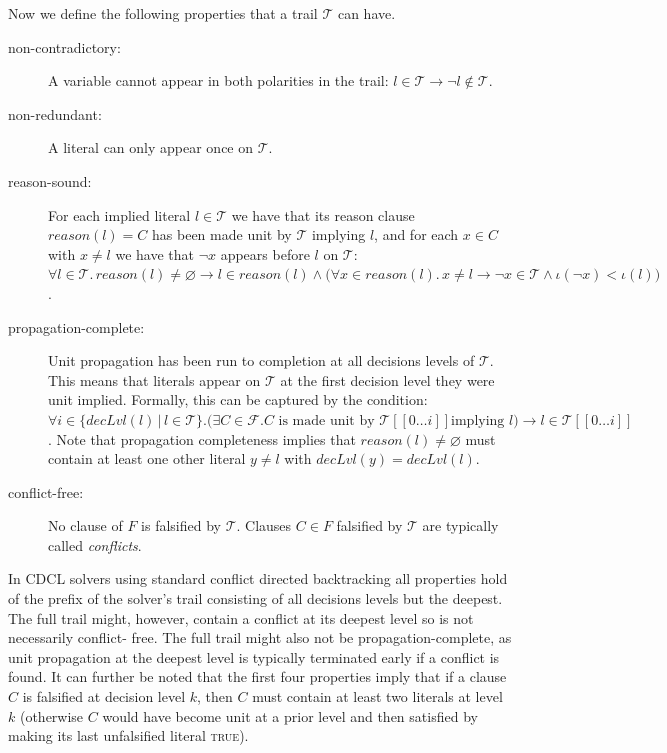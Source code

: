 \documentclass[runningheads]{llncs}
\newcommand{\trail}{\ensuremath{\mathcal{T}}}
\newcommand{\trailIdx}[1]{\ensuremath{\iota(#1)}}
\newcommand{\range}[2]{#1\ldots#2}
\newcommand{\dlevel}[1]{\ensuremath{\mathit{decLvl}(#1)}}
\newcommand{\true}{\textsc{true}\xspace}
\newcommand{\reason}[1]{\ensuremath{\mathit{reason}(#1)}}
\newcommand{\formula}{\ensuremath{\mathcal{F}}}
\renewcommand{\implies}{\rightarrow}
\begin{document}
Now we define the following properties that a trail $\trail$ can have.
\begin{description}
\item[non-contradictory:] A variable cannot appear in both polarities
    in the trail: $l\in \trail\implies \lnot l \not \in \trail$.
\item[non-redundant:] A literal can only appear once on $\trail$.
\item[reason-sound:] For each implied literal $l\in\trail$ we have
    that its reason clause $\reason{l}=C$ has been made unit by
    $\trail$ implying $l$, and for each $x\in C$ with $x\neq l$ we
    have that $\lnot x$ appears before $l$ on $\trail$:
    $\forall l\in\trail.\, \reason{l}\neq \varnothing \implies
    l\in\reason{l} \land \bigl(\forall x\in\reason{l}.\, x\neq l
    \implies \lnot x \in \trail \land \trailIdx{\lnot x} <
    \trailIdx{l}\bigr)$.
\item[propagation-complete:] Unit propagation has been run to
    completion at all decisions levels of $\trail$. This means that
    literals appear on $\trail$ at the first decision level they were
    unit implied. Formally, this can be captured by the condition:
    $\forall i \in \{\dlevel{l}\,|\,l\in \trail\}. \bigl(\exists
    C\in\formula. \mbox{$C$ is made unit by $\trail[[\range{0}{i}]]$
      implying $l$}\bigr) \implies l\in \trail[[\range{0}{i}]]$. Note
    that propagation completeness implies that
    $\reason{l}\neq \varnothing$ must contain at least one other
    literal $y\neq l$ with $\dlevel{y} = \dlevel{l}$.
\item[conflict-free:] No clause of $F$ is falsified by
    $\trail$. Clauses $C\in F$ falsified by $\trail$ are typically
    called \emph{conflicts}.
\end{description}

In CDCL solvers using standard conflict directed backtracking all
properties hold of the prefix of the solver's trail consisting of all
decisions levels but the deepest. The full trail might, however,
contain a conflict at its deepest level so is not necessarily conflict-
free. The full trail might also not be propagation-complete, as unit
propagation at the deepest level is typically terminated early if a
conflict is found. It can further be noted that the first four
properties imply that if a clause $C$ is falsified at decision level
$k$, then $C$ must contain at least two literals at level $k$
(otherwise $C$ would have become unit at a prior level and then
satisfied by making its last unfalsified literal \true).
\end{document}
